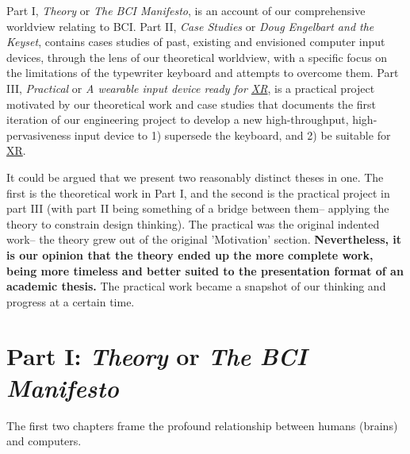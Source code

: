 \documentclass[logo,bsc,singlespacing,parskip]{infthesis}
\begin{document}
Part I, \emph{Theory} or \emph{The BCI Manifesto}, is an account of our comprehensive worldview relating to BCI.
Part II, \emph{Case Studies} or \emph{Doug Engelbart and the Keyset}, contains cases studies of past, existing and envisioned computer input devices, through the lens of our theoretical worldview, with a specific focus on the limitations of the typewriter keyboard and attempts to overcome them.
Part III, \emph{Practical} or \emph{A wearable input device ready for \hyperref[org1d567af]{XR}}, is a practical project motivated by our theoretical work and case studies that documents the first iteration of our engineering project to develop a new high-throughput, high-pervasiveness input device to 1) supersede the keyboard, and 2) be suitable for \hyperref[org1d567af]{XR}.

It could be argued that we present two reasonably distinct theses in one.
The first is the theoretical work in Part I, and the second is the practical project in part III (with part II being something of a bridge between them-- applying the theory to constrain design thinking).
The practical was the original indented work-- the theory grew out of the original 'Motivation' section.
\textbf{Nevertheless, it is our opinion that the theory ended up the more complete work, being more timeless and better suited to the presentation format of an academic thesis.}
The practical work became a snapshot of our thinking and progress at a certain time.
\section*{Part I: \emph{Theory} or \emph{The BCI Manifesto}}
\label{sec:orgbc98e1f}
The first two chapters frame the profound relationship between humans (brains) and computers.
\end{document}
